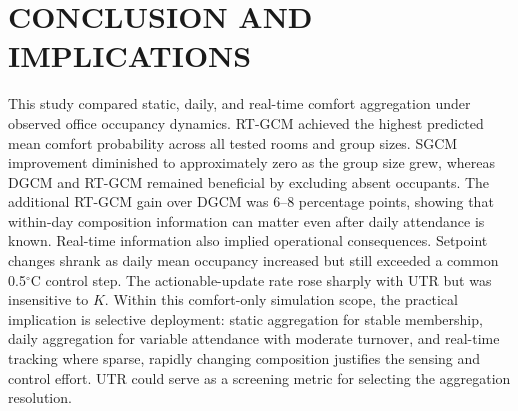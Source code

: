 \section{CONCLUSION AND IMPLICATIONS}
This study compared static, daily, and real-time comfort aggregation under observed office occupancy dynamics.
RT-GCM achieved the highest predicted mean comfort probability across all tested rooms and group sizes.
SGCM improvement diminished to approximately zero as the group size grew, whereas DGCM and RT-GCM remained beneficial by excluding absent occupants.
The additional RT-GCM gain over DGCM was 6--8 percentage points, showing that within-day composition information can matter even after daily attendance is known.
Real-time information also implied operational consequences.
Setpoint changes shrank as daily mean occupancy increased but still exceeded a common 0.5$^\circ$C control step.
The actionable-update rate rose sharply with UTR but was insensitive to $K$.
Within this comfort-only simulation scope, the practical implication is selective deployment: static aggregation for stable membership, daily aggregation for variable attendance with moderate turnover, and real-time tracking where sparse, rapidly changing composition justifies the sensing and control effort.
UTR could serve as a screening metric for selecting the aggregation resolution.